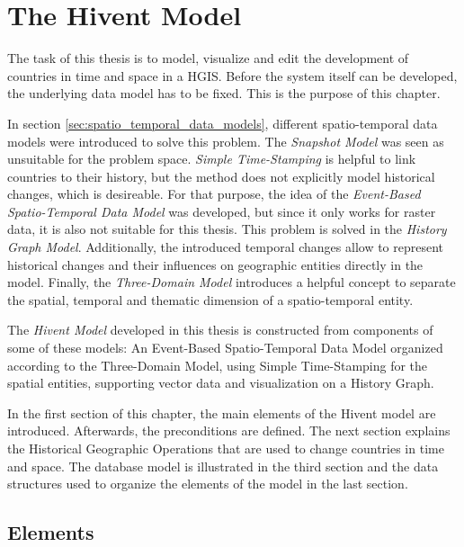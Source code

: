 
\chapter{The Hivent Model} %
\label{cha:the_hivent_model}

The task of this thesis is to model, visualize and edit the development of countries in time and space in a HGIS. Before the system itself can be developed, the underlying data model has to be fixed. This is the purpose of this chapter.

In section \ref{sec:spatio_temporal_data_models}, different spatio-temporal data models were introduced to solve this problem. The \emph{Snapshot Model} was seen as unsuitable for the problem space. \emph{Simple Time-Stamping} is helpful to link countries to their history, but the method does not explicitly model historical changes, which is desireable. For that purpose, the idea of the \emph{Event-Based Spatio-Temporal Data Model} was developed, but since it only works for raster data, it is also not suitable for this thesis. This problem is solved in the \emph{History Graph Model}. Additionally, the introduced temporal changes allow to represent historical changes and their influences on geographic entities directly in the model. Finally, the \emph{Three-Domain Model} introduces a helpful concept to separate the spatial, temporal and thematic dimension of a spatio-temporal entity.

The \emph{Hivent Model} developed in this thesis is constructed from components of some of these models: An Event-Based Spatio-Temporal Data Model organized according to the Three-Domain Model, using Simple Time-Stamping for the spatial entities, supporting vector data and visualization on a History Graph.

In the first section of this chapter, the main elements of the Hivent model are introduced. Afterwards, the preconditions are defined. The next section explains the Historical Geographic Operations that are used to change countries in time and space. The database model is illustrated in the third section and the data structures used to organize the elements of the model in the last section.

\section{Elements} %
\label{sec:elements}

